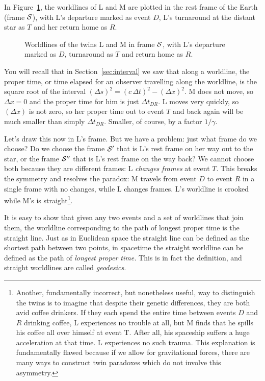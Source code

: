 In Figure~\ref{fig:twins}, the worldlines of L and M are plotted in
the rest frame of the Earth (frame $\cal S$), with L's departure
marked as event $D$, L's turnaround at the distant star as $T$ and her
return home as $R$.
\begin{figure}
\caption[Worldlines of the twins L and M.]{Worldlines of the twins L
and M in frame $\cal S$, with L's departure marked as $D$, turnaround
as $T$ and return home as $R$.}
\label{fig:twins}
\end{figure}
You will recall that in Section~\ref{sec:interval} we saw that along a
worldline, the proper time, or time elapsed for an observer
travelling along the worldline, is the square root of the interval
$(\Delta s)^2=(c\,\Delta t)^2-(\Delta x)^2$.  M does not move, so
$\Delta x=0$ and the proper time for him is just $\Delta t_{DR}$.  L
moves very quickly, so $(\Delta x)$ is not zero, so her proper time
out to event $T$ and back again will be much smaller than simply
$\Delta t_{DR}$.  Smaller, of course, by a factor $1/\gamma$.

Let's draw this now in L's frame.  But we have a problem: just what
frame do we choose?  Do we choose the frame $\cal S'$ that is L's
rest frame on her way out to the star, or the frame $\cal S''$ that
is L's rest frame on the way back?  We cannot choose both because they
are different frames: L {\em changes frames\/} at event $T$.  This
breaks the symmetry and resolves the paradox: M travels from event $D$
to event $R$ in a single frame with no changes, while L changes
frames.  L's worldline is crooked while M's is
straight\footnote{Another, fundamentally incorrect, but nonetheless
useful, way to distinguish the twins is to imagine that despite their
genetic differences, they are both avid coffee drinkers.  If they each
spend the entire time between events $D$ and $R$ drinking coffee, L
experiences no trouble at all, but M finds that he spills his coffee
all over himself at event T.  After all, his spaceship suffers a huge
acceleration at that time.  L experiences no such trauma.  This
explanation is fundamentally flawed because if we allow for
gravitational forces, there are many ways to construct twin paradoxes
which do not involve this asymmetry.}.

It is easy to show that given any two events and a set of worldlines
that join them, the worldline corresponding to the path of longest
proper time is the straight line.  Just as in Euclidean space the
straight line can be defined as the shortest path between two points,
in spacetime the straight worldline can be defined as the path of
{\em longest proper time.\/}  This is in fact the definition, and
straight worldlines are called {\em geodesics.\/}

